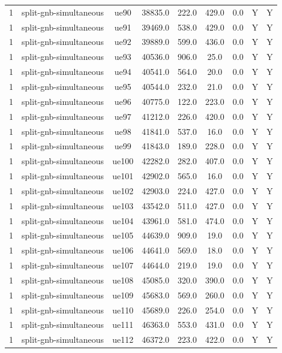 \begin{table}[ht]
\begin{tabular}{|c|c|c|c|c|c|c|c|c|}
1 & split-gnb-simultaneous & ue90 & 38835.0 & 222.0 & 429.0 & 0.0 & Y & Y \\
1 & split-gnb-simultaneous & ue91 & 39469.0 & 538.0 & 429.0 & 0.0 & Y & Y \\
1 & split-gnb-simultaneous & ue92 & 39889.0 & 599.0 & 436.0 & 0.0 & Y & Y \\
1 & split-gnb-simultaneous & ue93 & 40536.0 & 906.0 & 25.0 & 0.0 & Y & Y \\
1 & split-gnb-simultaneous & ue94 & 40541.0 & 564.0 & 20.0 & 0.0 & Y & Y \\
1 & split-gnb-simultaneous & ue95 & 40544.0 & 232.0 & 21.0 & 0.0 & Y & Y \\
1 & split-gnb-simultaneous & ue96 & 40775.0 & 122.0 & 223.0 & 0.0 & Y & Y \\
1 & split-gnb-simultaneous & ue97 & 41212.0 & 226.0 & 420.0 & 0.0 & Y & Y \\
1 & split-gnb-simultaneous & ue98 & 41841.0 & 537.0 & 16.0 & 0.0 & Y & Y \\
1 & split-gnb-simultaneous & ue99 & 41843.0 & 189.0 & 228.0 & 0.0 & Y & Y \\
1 & split-gnb-simultaneous & ue100 & 42282.0 & 282.0 & 407.0 & 0.0 & Y & Y \\
1 & split-gnb-simultaneous & ue101 & 42902.0 & 565.0 & 16.0 & 0.0 & Y & Y \\
1 & split-gnb-simultaneous & ue102 & 42903.0 & 224.0 & 427.0 & 0.0 & Y & Y \\
1 & split-gnb-simultaneous & ue103 & 43542.0 & 511.0 & 427.0 & 0.0 & Y & Y \\
1 & split-gnb-simultaneous & ue104 & 43961.0 & 581.0 & 474.0 & 0.0 & Y & Y \\
1 & split-gnb-simultaneous & ue105 & 44639.0 & 909.0 & 19.0 & 0.0 & Y & Y \\
1 & split-gnb-simultaneous & ue106 & 44641.0 & 569.0 & 18.0 & 0.0 & Y & Y \\
1 & split-gnb-simultaneous & ue107 & 44644.0 & 219.0 & 19.0 & 0.0 & Y & Y \\
1 & split-gnb-simultaneous & ue108 & 45085.0 & 320.0 & 390.0 & 0.0 & Y & Y \\
1 & split-gnb-simultaneous & ue109 & 45683.0 & 569.0 & 260.0 & 0.0 & Y & Y \\
1 & split-gnb-simultaneous & ue110 & 45689.0 & 226.0 & 254.0 & 0.0 & Y & Y \\
1 & split-gnb-simultaneous & ue111 & 46363.0 & 553.0 & 431.0 & 0.0 & Y & Y \\
1 & split-gnb-simultaneous & ue112 & 46372.0 & 223.0 & 422.0 & 0.0 & Y & Y \\

\end{tabular}
\end{table}
